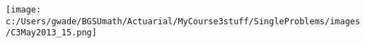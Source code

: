 
\texttt{[image: c:/Users/gwade/BGSUmath/Actuarial/MyCourse3stuff/SingleProblems/images/C3May2013\_15.png]}
\showsol{\bsoln

\esoln}
